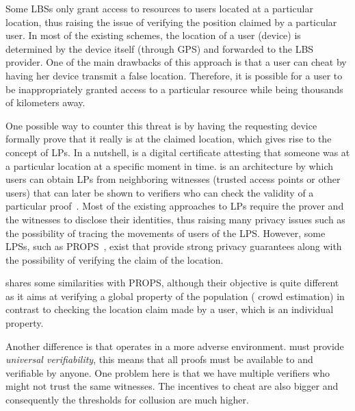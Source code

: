 Some \acp{LBS} only grant access to resources to users located at a particular 
location, thus raising the issue of verifying the position claimed by a 
particular user.
In most of the existing schemes, the location of a user (device) is determined 
by the device itself (\eg through GPS) and forwarded to the \ac{LBS} provider.
One of the main drawbacks of this approach is that a user can cheat by having 
her device transmit a false location.
Therefore, it is possible for a user to be inappropriately granted access to a 
particular resource while being thousands of kilometers away.

One possible way to counter this threat is by having the requesting device 
formally prove that it really is at the claimed location, which gives rise to 
the concept of \acp{LP}.
In a nutshell,  is a digital certificate attesting that someone was at 
a particular location at a specific moment in time.
 is an architecture by which users can obtain \acp{LP} from 
neighboring witnesses (\eg trusted access points or other users) that can later 
be shown to verifiers who can check the validity of a particular 
proof~\cite{luo2010veriplace,zhu2011applaus}.
Most of the existing approaches to \acp{LP} require the prover and the 
witnesses to disclose their identities, thus raising many privacy issues such 
as the possibility of tracing the movements of users of the \ac{LPS}.
However, some \acp{LPS}, such as PROPS~\cite{PROPS}, exist that provide strong 
privacy guarantees along with the possibility of verifying the claim of the 
location.

\CROCUS shares some similarities with PROPS, although their objective is quite 
different as it aims at verifying a global property of the population (\ie 
crowd estimation) in contrast to checking the location claim made by a user, 
which is an individual property.

Another difference is that \CROCUS operates in a more adverse environment.
\CROCUS must provide \emph{universal verifiability}, this means that all proofs 
must be available to and verifiable by anyone.
One problem here is that we have multiple verifiers who might not trust the 
same witnesses.
The incentives to cheat are also bigger and consequently the thresholds for 
collusion are much higher.

